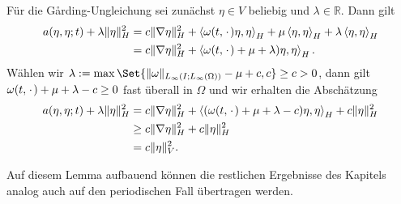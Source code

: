 \documentclass[../main.tex]{subfiles}
\begin{document}
\begin{Lemma}
\begin{Beweis}
        Für die G\aa{}rding-Ungleichung sei zunächst $\eta \in V$ beliebig und $\lambda \in \mathbb{R}$.
        Dann gilt
        \begin{align}
            a(\eta, \eta; t) + \lambda \lVert\eta\rVert^{2}_{H}
            &= c \lVert\nabla \eta\rVert^{2}_{H} + \left\langle\omega(t, {\mkern2mu\cdot\mkern2mu}) \eta,\eta\right\rangle_{H} + \mu \left\langle\eta,\eta\right\rangle_{H} + \lambda \left\langle\eta,\eta\right\rangle_{H}
            \\&= c \lVert\nabla \eta\rVert^{2}_{H} + \left\langle\omega(t, {\mkern2mu\cdot\mkern2mu}) + \mu + \lambda) \eta,\eta\right\rangle_{H}.
        \end{align}
        Wählen wir $\lambda := \max\Set{\norm{\omega}_{L_{\infty}(I; L_{\infty}(\Omega))} - \mu + c, c} \geq c > 0$, dann gilt $\omega(t, {\mkern2mu\cdot\mkern2mu}) + \mu + \lambda - c \geq 0$ fast überall in $\Omega$ und wir erhalten die Abschätzung
        \begin{align}
            a(\eta, \eta; t) + \lambda \lVert\eta\rVert^{2}_{H}
            &= c \lVert\nabla \eta\rVert^{2}_{H} + \left\langle(\omega(t, {\mkern2mu\cdot\mkern2mu}) + \mu + \lambda - c) \eta,\eta\right\rangle_{H} + c \lVert\eta\rVert^{2}_{H} \\
            &\geq c \lVert\nabla \eta\rVert^{2}_{H} + c \lVert\eta\rVert^{2}_{H}
            \\&= c \lVert\eta\rVert^{2}_{V}.
        \end{align}
    \end{Beweis}
\end{Lemma}

Auf diesem Lemma aufbauend können die restlichen Ergebnisse des Kapitels analog auch auf den periodischen Fall übertragen werden.
\end{document}
